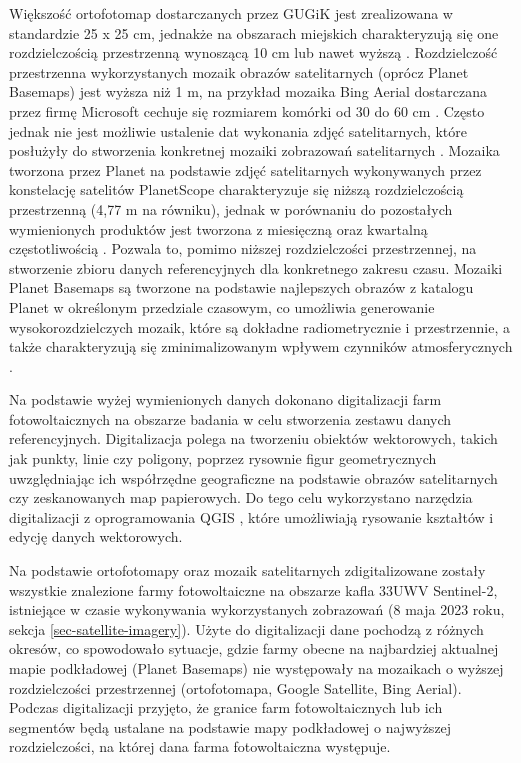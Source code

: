 \documentclass{amuthesis}
\begin{document}
Większość ortofotomap dostarczanych przez GUGiK jest zrealizowana w
standardzie 25 x 25 cm, jednakże na obszarach miejskich charakteryzują
się one rozdzielczością przestrzenną wynoszącą 10 cm lub nawet wyższą
\autocite{ortofotomapa}. Rozdzielczość przestrzenna wykorzystanych
mozaik obrazów satelitarnych (oprócz Planet Basemaps) jest wyższa niż 1
m, na przykład mozaika Bing Aerial dostarczana przez firmę Microsoft
cechuje się rozmiarem komórki od 30 do 60 cm \autocite{bing_aerial}.
Często jednak nie jest możliwie ustalenie dat wykonania zdjęć
satelitarnych, które posłużyły do stworzenia konkretnej mozaiki
zobrazowań satelitarnych \autocite{lesiv_2018_sat_imagery_mosaics}.
Mozaika tworzona przez Planet na podstawie zdjęć satelitarnych
wykonywanych przez konstelację satelitów PlanetScope charakteryzuje się
niższą rozdzielczością przestrzenną (4,77 m na równiku), jednak w
porównaniu do pozostałych wymienionych produktów jest tworzona z
miesięczną oraz kwartalną częstotliwością
\autocite{planet_2019_basemaps}. Pozwala to, pomimo niższej
rozdzielczości przestrzennej, na stworzenie zbioru danych referencyjnych
dla konkretnego zakresu czasu. Mozaiki Planet Basemaps \autocite{planet}
są tworzone na podstawie najlepszych obrazów z katalogu Planet w
określonym przedziale czasowym, co umożliwia generowanie
wysokorozdzielczych mozaik, które są dokładne radiometrycznie i
przestrzennie, a także charakteryzują się zminimalizowanym wpływem
czynników atmosferycznych \autocite{planet_2019_basemaps}.

Na podstawie wyżej wymienionych danych dokonano digitalizacji farm
fotowoltaicznych na obszarze badania w celu stworzenia zestawu danych
referencyjnych. Digitalizacja polega na tworzeniu obiektów wektorowych,
takich jak punkty, linie czy poligony, poprzez rysownie figur
geometrycznych uwzględniając ich współrzędne geograficzne na podstawie
obrazów satelitarnych czy zeskanowanych map papierowych. Do tego celu
wykorzystano narzędzia digitalizacji z oprogramowania QGIS
\autocite{qgis}, które umożliwiają rysowanie kształtów i edycję danych
wektorowych.

Na podstawie ortofotomapy oraz mozaik satelitarnych zdigitalizowane
zostały wszystkie znalezione farmy fotowoltaiczne na obszarze kafla
33UWV Sentinel-2, istniejące w czasie wykonywania wykorzystanych
zobrazowań (8 maja 2023 roku, sekcja \ref{sec-satellite-imagery}). Użyte
do digitalizacji dane pochodzą z różnych okresów, co spowodowało
sytuacje, gdzie farmy obecne na najbardziej aktualnej mapie podkładowej
(Planet Basemaps) nie występowały na mozaikach o wyższej rozdzielczości
przestrzennej (ortofotomapa, Google Satellite, Bing Aerial). Podczas
digitalizacji przyjęto, że granice farm fotowoltaicznych lub ich
segmentów będą ustalane na podstawie mapy podkładowej o najwyższej
rozdzielczości, na której dana farma fotowoltaiczna występuje.
\end{document}
